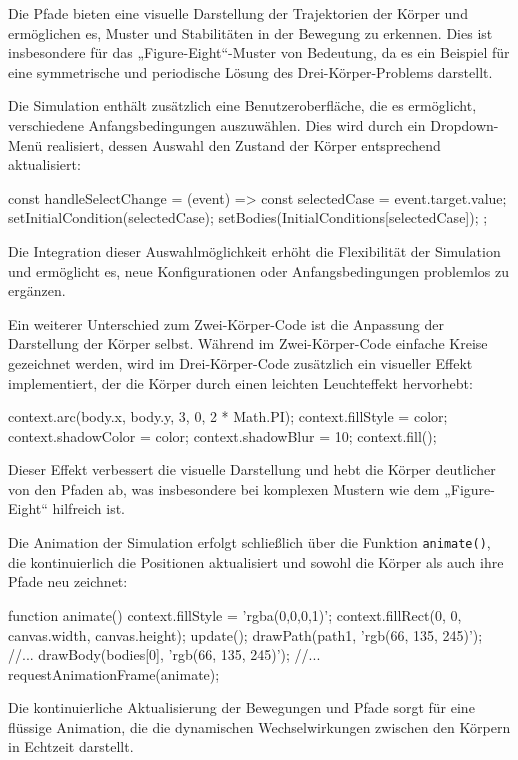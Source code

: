 \documentclass[a4paper,12pt,twoside]{article}
\begin{document}
Die Pfade bieten eine visuelle Darstellung der Trajektorien der Körper und ermöglichen es, Muster und Stabilitäten in der Bewegung zu erkennen. Dies ist insbesondere für das „Figure-Eight“-Muster von Bedeutung, da es ein Beispiel für eine symmetrische und periodische Lösung des Drei-Körper-Problems darstellt.

Die Simulation enthält zusätzlich eine Benutzeroberfläche, die es ermöglicht, verschiedene Anfangsbedingungen auszuwählen. Dies wird durch ein Dropdown-Menü realisiert, dessen Auswahl den Zustand der Körper entsprechend aktualisiert:

\begin{javascript}
const handleSelectChange = (event) => {
    const selectedCase = event.target.value;
    setInitialCondition(selectedCase);
    setBodies(InitialConditions[selectedCase]);
};
\end{javascript}

Die Integration dieser Auswahlmöglichkeit erhöht die Flexibilität der Simulation und ermöglicht es, neue Konfigurationen oder Anfangsbedingungen problemlos zu ergänzen.

Ein weiterer Unterschied zum Zwei-Körper-Code ist die Anpassung der Darstellung der Körper selbst. Während im Zwei-Körper-Code einfache Kreise gezeichnet werden, wird im Drei-Körper-Code zusätzlich ein visueller Effekt implementiert, der die Körper durch einen leichten Leuchteffekt hervorhebt:

\begin{javascript}
context.arc(body.x, body.y, 3, 0, 2 * Math.PI);
context.fillStyle = color;
context.shadowColor = color;
context.shadowBlur = 10;
context.fill();
\end{javascript}

Dieser Effekt verbessert die visuelle Darstellung und hebt die Körper deutlicher von den Pfaden ab, was insbesondere bei komplexen Mustern wie dem „Figure-Eight“ hilfreich ist.

Die Animation der Simulation erfolgt schließlich über die Funktion \texttt{animate()}, die kontinuierlich die Positionen aktualisiert und sowohl die Körper als auch ihre Pfade neu zeichnet:

\begin{javascript}
function animate() {
    context.fillStyle = 'rgba(0,0,0,1)';
    context.fillRect(0, 0, canvas.width, canvas.height);
    update();
    drawPath(path1, 'rgb(66, 135, 245)');
    //...
    drawBody(bodies[0], 'rgb(66, 135, 245)');
	//...
    requestAnimationFrame(animate);
}
\end{javascript}
Die kontinuierliche Aktualisierung der Bewegungen und Pfade sorgt für eine flüssige Animation, die die dynamischen Wechselwirkungen zwischen den Körpern in Echtzeit darstellt.
\end{document}
